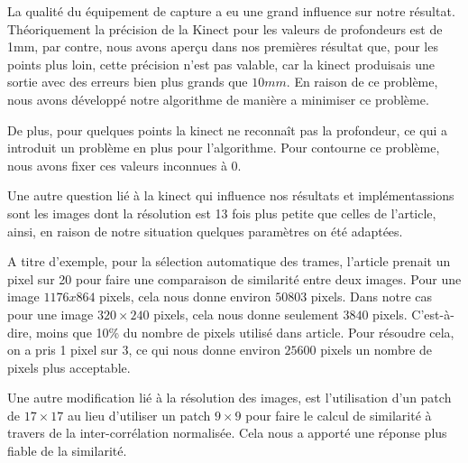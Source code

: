 \documentclass[a4paper,12pt]{article}
\begin{document}

La qualité du équipement de capture a eu une grand influence sur notre
résultat. Théoriquement la précision de la Kinect pour les valeurs de
profondeurs est de 1mm, par contre, nous avons aperçu dans nos
premières résultat que, pour les points plus loin, cette
précision n'est pas valable, car la kinect produisais une sortie avec
des erreurs bien plus grands que $10 mm$. 
En raison de ce problème, nous avons développé notre algorithme de
manière a minimiser ce problème.

De plus, pour quelques points la kinect ne reconnaît pas la
profondeur, ce qui a introduit un problème en plus pour l'algorithme. 
Pour contourne ce problème, nous avons fixer ces valeurs inconnues à
0. 

Une autre question lié à la kinect qui influence nos résultats et
implémentassions sont les images dont la résolution est 13 fois plus
petite que celles de l'article, ainsi, en raison de notre situation
quelques paramètres on été adaptées.

A titre d'exemple, pour la sélection automatique des trames, l'article
prenait un pixel sur 20 pour faire une comparaison de similarité
entre deux images. Pour une image $1176 x 864$ pixels, cela nous donne
environ $50803$ pixels. Dans notre cas pour une image $320 \times 240$ pixels,
cela nous donne seulement $3840$ pixels. C'est-à-dire, moins que 10\% du
nombre de pixels utilisé dans article. Pour résoudre cela, on a pris 1
pixel sur 3, ce qui nous donne environ $25600$ pixels un nombre de
pixels plus acceptable.

Une autre modification lié à la résolution des images, est
l'utilisation d'un patch de $17 \times 17$ au lieu d'utiliser un patch
$9 \times 9$ pour faire le calcul de similarité à travers de la
inter-corrélation normalisée. Cela nous a apporté une réponse plus
fiable de la similarité.   



\nocite{Beeler:2010:HSC:1778765.1778777}

\begin{small}
  
\end{small}
\section*{}
\end{document}
